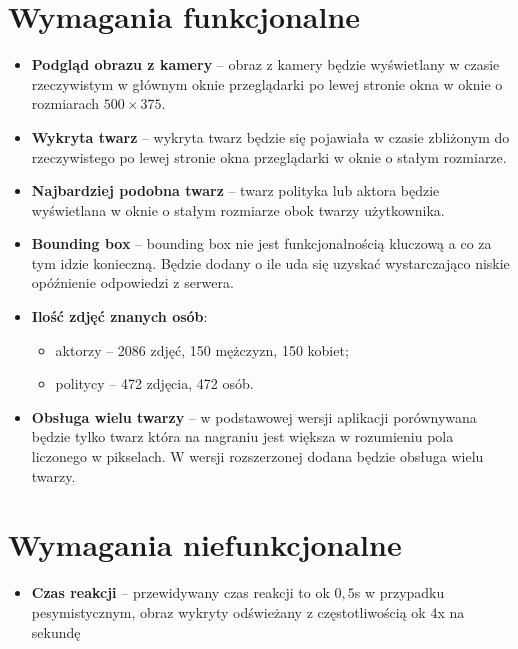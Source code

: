 \documentclass[a4paper]{mwart}
\begin{document}
\section{Wymagania funkcjonalne}
\begin{itemize}
	\item \textbf{Podgląd obrazu z kamery} -- obraz z kamery będzie wyświetlany w czasie rzeczywistym w głównym oknie przeglądarki po lewej stronie okna w oknie o rozmiarach $500 \times 375$.
	\item \textbf{Wykryta twarz} -- wykryta twarz będzie się pojawiała w czasie zbliżonym do rzeczywistego po lewej stronie okna przeglądarki w oknie o stałym rozmiarze.
	\item \textbf{Najbardziej podobna twarz} -- twarz polityka lub aktora będzie wyświetlana w oknie o stałym rozmiarze obok twarzy użytkownika.
	\item \textbf{Bounding box} -- bounding box nie jest funkcjonalnością kluczową a co za tym idzie konieczną. Będzie dodany o ile uda się uzyskać wystarczająco niskie opóźnienie odpowiedzi z serwera.
	\item \textbf{Ilość zdjęć znanych osób}:
		\begin{itemize}
			\item aktorzy -- 2086 zdjęć, 150 mężczyzn, 150 kobiet;
			\item politycy -- 472 zdjęcia, 472 osób.
		\end{itemize}
	\item \textbf{Obsługa wielu twarzy} -- w podstawowej wersji aplikacji porównywana będzie tylko twarz która na nagraniu jest większa w rozumieniu pola liczonego w pikselach. W wersji rozszerzonej dodana będzie obsługa wielu twarzy.
\end{itemize}

\section{Wymagania niefunkcjonalne}

\begin{itemize}
	\item \textbf{Czas reakcji} -- przewidywany czas reakcji to ok $0{,}5$s w przypadku pesymistycznym, obraz wykryty odświeżany z częstotliwością ok 4x na sekundę
\end{itemize}
\end{document}

